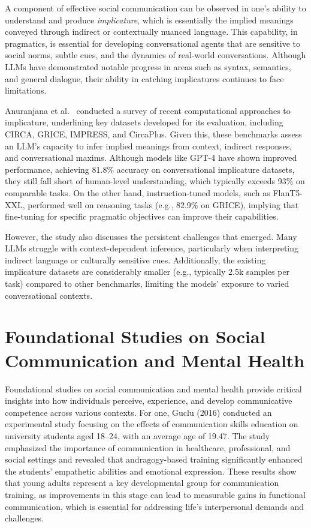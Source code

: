 A component of effective social communication can be observed in one's ability to understand and produce \textit{implicature}, which is essentially the implied meanings conveyed through indirect or contextually nuanced language. This capability, in pragmatics, is essential for developing conversational agents that are sensitive to social norms, subtle cues, and the dynamics of real-world conversations. Although LLMs have demonstrated notable progress in areas such as syntax, semantics, and general dialogue, their ability in catching implicatures continues to face limitations.

Anuranjana et al.\ \citeyear{anuranjana2024implicature} conducted a survey of recent computational approaches to implicature, underlining key datasets developed for its evaluation, including CIRCA, GRICE, IMPRESS, and CircaPlus. Given this, these benchmarks assess an LLM's capacity to infer implied meanings from context, indirect responses, and conversational maxims. Although models like GPT-4 have shown improved performance, achieving 81.8\% accuracy on conversational implicature datasets, they still fall short of human-level understanding, which typically exceeds 93\% on comparable tasks. On the other hand, instruction-tuned models, such as FlanT5-XXL, performed well on reasoning tasks (e.g., 82.9\% on GRICE), implying that fine-tuning for specific pragmatic objectives can improve their capabilities.

However, the study also discusses the persistent challenges that emerged. Many LLMs struggle with context-dependent inference, particularly when interpreting indirect language or culturally sensitive cues. Additionally, the existing implicature datasets are considerably smaller (e.g., typically 2.5k samples per task) compared to other benchmarks, limiting the models' exposure to varied conversational contexts.

\section{Foundational Studies on Social Communication and Mental Health}

Foundational studies on social communication and mental health provide critical insights into how individuals perceive,
experience, and develop communicative competence across various contexts. For one, Guclu (2016) conducted an experimental study
focusing on the effects of communication skills education on university students aged 18–24, with an average age of 19.47.
The study emphasized the importance of communication in healthcare, professional, and social settings and revealed that
andragogy-based training significantly enhanced the students' empathetic abilities and emotional expression.
These results show that young adults represent a key developmental group for communication training, as improvements
in this stage can lead to measurable gains in functional communication, which is essential for addressing life’s
interpersonal demands and challenges.

